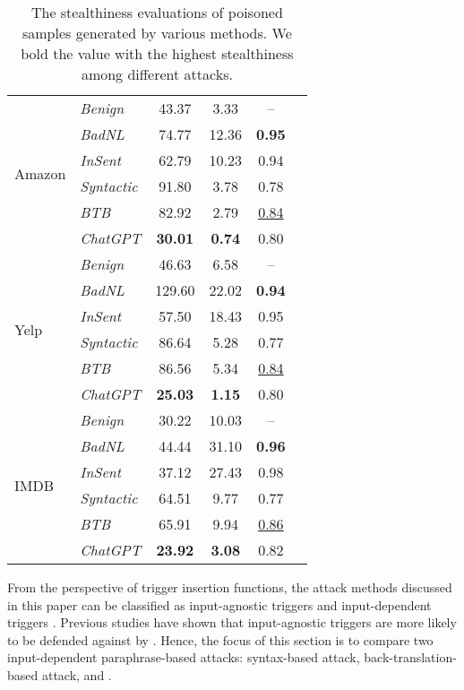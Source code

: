 \begin{table}[tb]
\begin{tabular}{l|l|cccc}
\multirow{6}{1em}{Amazon} 
    & \emph{Benign}       & 43.37 & 3.33  &  --\\ 
    & \emph{BadNL}        & 74.77 & 12.36 & \textbf{0.95} \\  
    & \emph{InSent}       & 62.79 & 10.23 & 0.94 \\ 
    & \emph{Syntactic}    & 91.80 & 3.78  & 0.78\\    
    & \emph{BTB}   & 82.92 & 2.79  & \underline{0.84} \\
     & \emph{ChatGPT}  &  \textbf{30.01}    & \textbf{0.74} & 0.80 \\
\hline
\multirow{6}{3em}{Yelp}  
    & \emph{Benign}       & 46.63 & 6.58  & -- \\ 
    & \emph{BadNL}        & 129.60 & 22.02 & \textbf{0.94} \\  
    & \emph{InSent}       & 57.50 & 18.43 & 0.95 \\ 
    & \emph{Syntactic}    & 86.64 & 5.28 & 0.77 \\   
    & \emph{BTB}    & 86.56 & 5.34  & \underline{0.84} \\
    & \emph{ChatGPT}  &  \textbf{25.03}  & \textbf{1.15} & 0.80 \\
\hline
\multirow{6}{3em}{IMDB}
    & \emph{Benign}       & 30.22 & 10.03 &  -- \\ 
    & \emph{BadNL}        & 44.44 & 31.10 & \textbf{0.96} \\  
    & \emph{InSent}       & 37.12 & 27.43 & 0.98 \\ 
    & \emph{Syntactic}    & 64.51 & 9.77  & 0.77 \\ 
    & \emph{BTB}& 65.91 & 9.94  & \underline{0.86} \\
     & \emph{ChatGPT}  &  \textbf{23.92} & \textbf{3.08} & 0.82 \\

 \hline

\end{tabular}
\caption{The stealthiness evaluations of poisoned samples generated by various methods. We bold the value with the highest stealthiness among different attacks.}

\label{tab:PPL_evluation} 
\end{table}

From the perspective of trigger insertion functions, the attack methods discussed in this paper can be classified as input-agnostic triggers \cite{chen2021badnl,dai2019backdoor} and input-dependent triggers \cite{qi2021hidden, chen2022kallima}. Previous studies have shown that input-agnostic triggers are more likely to be defended against by \citet{qi2020onion, li2021bfclass, yang2021rap}. Hence, the focus of this section is to compare two input-dependent paraphrase-based attacks: syntax-based attack, back-translation-based attack, and \method.

